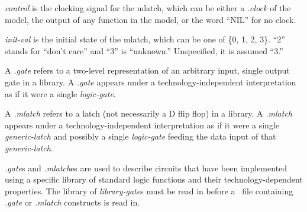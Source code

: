 {\begin{pespace}
\begin{description}
\item {\em control} is the clocking signal for the mlatch, which can be
either a {\em .clock} of the model, the output of any function in the model,
or the word ``NIL'' for no clock.

\item {\em init-val} is the initial state of the mlatch, which can be one of
\{0, 1, 2, 3\}.  ``2'' stands for ``don't care'' and ``3'' is ``unknown.''
Unspecified, it is assumed ``3.''
\end{description}

A {\em .gate} refers to a two-level representation of an arbitrary input,
single output gate in a library.  A {\em .gate} appears under a
technology-independent interpretation as if it were a single {\em
logic-gate}.

A {\em .mlatch} refers to a latch (not necessarily a D flip flop) in a
library.  A {\em .mlatch} appears under a technology-independent
interpretation as if it were a single {\em generic-latch} and possibly a
single {\em logic-gate} feeding the data input of that {\em generic-latch}.

{\em .gate}s and {\em .mlatch}es are used to describe circuits that have been
implemented using a specific library of standard logic functions and their
technology-dependent properties.  The library of {\em library-gate}s must be
read in before a \BLIF\ file containing {\em .gate} or {\em .mlatch}
constructs is read in.


\end{pespace}}
